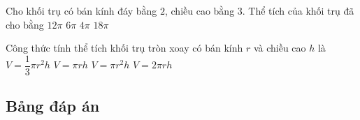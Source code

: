 \begin{ex}%
	Cho khối trụ có bán kính đáy bằng $2$, chiều cao bằng $3$. Thể tích của khối trụ đã cho bằng
	\choice
	{\True $12\pi$}
	{$6\pi$}
	{$4\pi$}
	{$18\pi$}
\end{ex}
\begin{ex}%
	Công thức tính thể tích khối trụ tròn xoay có bán kính $r$ và chiều cao $h$ là
	\choice
	{$V=\dfrac{1}{3}\pi r^2h$}
	{$V=\pi rh$}
	{\True $V=\pi r^2h$}
	{$V=2\pi rh$}
\end{ex}
\subsection{Bảng đáp án}
